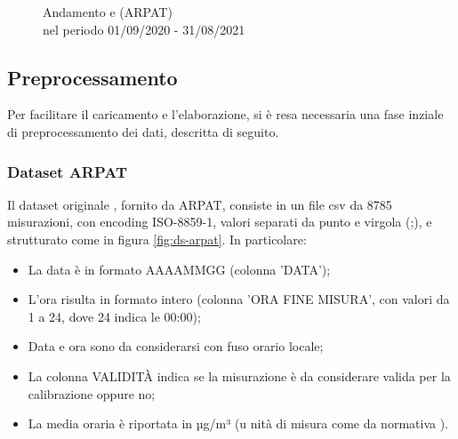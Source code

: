 \begin{figure}[H]%
    \centering
    \captionsetup{justification=centering}
    \caption{Andamento  e  (ARPAT)\\nel periodo 01/09/2020 - 31/08/2021}%
    \label{fig:arpat-pm}%
\end{figure}

\subsection{Preprocessamento}\label{ssec:preprocessamento}
Per facilitare il caricamento e l'elaborazione, si è resa necessaria una fase inziale di preprocessamento dei dati, descritta di seguito.

\subsubsection{Dataset ARPAT }
Il dataset originale , fornito da ARPAT, consiste in un file csv da 8785 misurazioni, con encoding ISO-8859-1, valori separati da punto e virgola (;), e strutturato come in figura \ref{fig:ds-arpat}. In particolare:
\begin{itemize}
  \item La data è in formato AAAAMMGG (colonna 'DATA');
  \item L'ora risulta in formato intero (colonna 'ORA FINE MISURA', con valori da 1 a 24, dove 24 indica le 00:00);
  \item Data e ora sono da considerarsi con fuso orario locale;
  \item La colonna VALIDITÀ indica se la misurazione è da considerare valida per la calibrazione oppure no;
  \item La media oraria è riportata in µg/m³ (u nità di misura come da normativa \cite{dlgs}).
\end{itemize}

